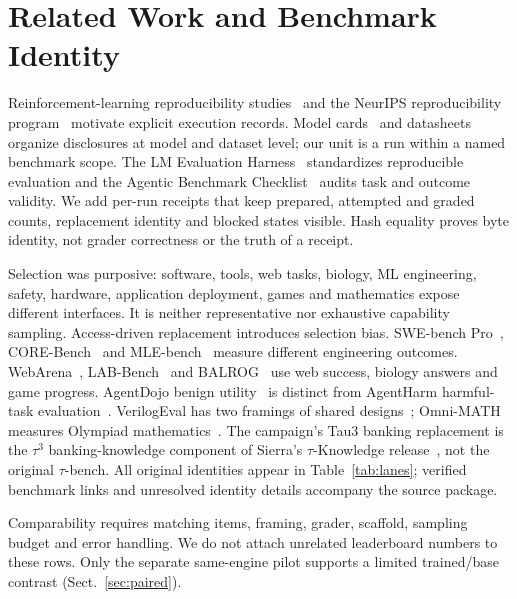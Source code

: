 \documentclass[a4paper,runningheads]{llncs}
\begin{document}
\section{Related Work and Benchmark Identity}
Reinforcement-learning reproducibility studies~\cite{henderson2018deep} and the
NeurIPS reproducibility program~\cite{pineau2020improving} motivate explicit
execution records. Model cards~\cite{mitchell2019modelcards} and
datasheets~\cite{gebru2021datasheets} organize disclosures at model and dataset
level; our unit is a run within a named benchmark scope. The LM Evaluation
Harness~\cite{biderman2024lessons} standardizes reproducible evaluation and the
Agentic Benchmark Checklist~\cite{zhu2025abc} audits task and outcome validity. We add per-run receipts that keep prepared, attempted and
graded counts, replacement identity and blocked states visible. Hash equality proves
byte identity, not grader correctness or the truth of a receipt.

Selection was purposive: software, tools, web tasks, biology, ML engineering,
safety, hardware, application deployment, games and mathematics expose
different interfaces. It is neither representative nor exhaustive capability
sampling. Access-driven replacement introduces selection bias.
SWE-bench Pro~\cite{deng2025swebenchpro}, CORE-Bench~\cite{siegel2024corebench}
and MLE-bench~\cite{chan2025mlebench} measure different engineering outcomes.
WebArena~\cite{zhou2024webarena}, LAB-Bench~\cite{laurent2024labbench} and
BALROG~\cite{paglieri2025balrog} use web success, biology answers and game
progress. AgentDojo benign utility~\cite{debenedetti2024agentdojo} is distinct
from AgentHarm harmful-task evaluation~\cite{andriushchenko2025agentharm}.
VerilogEval has two framings of shared designs~\cite{liu2023verilogeval,pinckney2025revisiting};
Omni-MATH measures Olympiad mathematics~\cite{gao2024omnimath}.
The campaign's Tau3 banking replacement is the $\tau^3$ banking-knowledge component of Sierra's
$\tau$-Knowledge release~\cite{shi2026tauknowledge}, not the original $\tau$-bench. All original identities appear in Table~\ref{tab:lanes}; verified
benchmark links and unresolved identity details accompany the source package.

Comparability requires matching items, framing, grader, scaffold, sampling
budget and error handling. We do not attach unrelated leaderboard numbers to
these rows. Only the separate same-engine pilot supports a limited trained/base
contrast (Sect.~\ref{sec:paired}).
\end{document}
